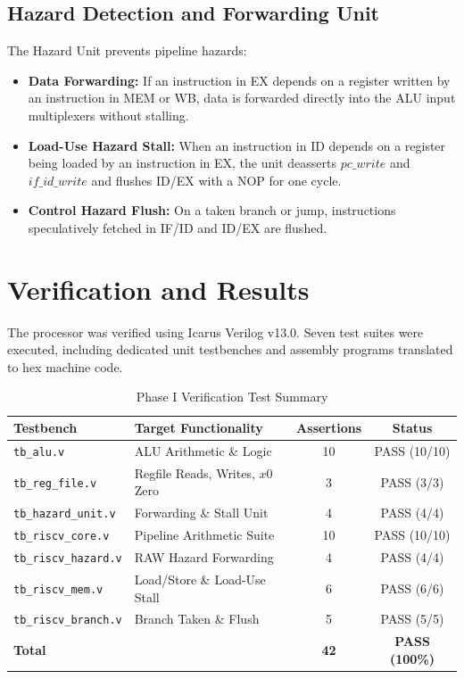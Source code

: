 \documentclass[conference]{IEEEtran}
\begin{document}
\subsection{Hazard Detection and Forwarding Unit}
The Hazard Unit prevents pipeline hazards:
\begin{itemize}
    \item \textbf{Data Forwarding:} If an instruction in EX depends on a register written by an instruction in MEM or WB, data is forwarded directly into the ALU input multiplexers without stalling.
    \item \textbf{Load-Use Hazard Stall:} When an instruction in ID depends on a register being loaded by an instruction in EX, the unit deasserts $pc\_write$ and $if\_id\_write$ and flushes ID/EX with a NOP for one cycle.
    \item \textbf{Control Hazard Flush:} On a taken branch or jump, instructions speculatively fetched in IF/ID and ID/EX are flushed.
\end{itemize}

\section{Verification and Results}
The processor was verified using Icarus Verilog v13.0. Seven test suites were executed, including dedicated unit testbenches and assembly programs translated to hex machine code.

\begin{table}[htbp]
\caption{Phase I Verification Test Summary}
\begin{center}
\begin{tabular}{llcc}
\toprule
\textbf{Testbench} & \textbf{Target Functionality} & \textbf{Assertions} & \textbf{Status} \\
\midrule
\texttt{tb\_alu.v} & ALU Arithmetic \& Logic & 10 & PASS (10/10) \\
\texttt{tb\_reg\_file.v} & Regfile Reads, Writes, $x0$ Zero & 3 & PASS (3/3) \\
\texttt{tb\_hazard\_unit.v} & Forwarding \& Stall Unit & 4 & PASS (4/4) \\
\texttt{tb\_riscv\_core.v} & Pipeline Arithmetic Suite & 10 & PASS (10/10) \\
\texttt{tb\_riscv\_hazard.v} & RAW Hazard Forwarding & 4 & PASS (4/4) \\
\texttt{tb\_riscv\_mem.v} & Load/Store \& Load-Use Stall & 6 & PASS (6/6) \\
\texttt{tb\_riscv\_branch.v} & Branch Taken \& Flush & 5 & PASS (5/5) \\
\midrule
\textbf{Total} & & \textbf{42} & \textbf{PASS (100\%)} \\
\bottomrule
\end{tabular}
\end{center}
\end{table}
\end{document}
